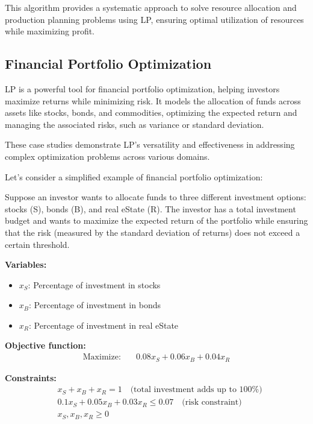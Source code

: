 \documentclass[12pt]{book} %
\begin{document}
This algorithm provides a systematic approach to solve resource allocation and production planning problems using LP, ensuring optimal utilization of resources while maximizing profit.

\subsection{Financial Portfolio Optimization}

LP is a powerful tool for financial portfolio optimization, helping investors maximize returns while minimizing risk. It models the allocation of funds across assets like stocks, bonds, and commodities, optimizing the expected return and managing the associated risks, such as variance or standard deviation.

These case studies demonstrate LP's versatility and effectiveness in addressing complex optimization problems across various domains.

Let's consider a simplified example of financial portfolio optimization:

Suppose an investor wants to allocate funds to three different investment options: stocks (S), bonds (B), and real eState (R). The investor has a total investment budget and wants to maximize the expected return of the portfolio while ensuring that the risk (measured by the standard deviation of returns) does not exceed a certain threshold.

\textbf{Variables:}
\begin{itemize}
    \item \(x_S\): Percentage of investment in stocks
    \item \(x_B\): Percentage of investment in bonds
    \item \(x_R\): Percentage of investment in real eState
\end{itemize}

\textbf{Objective function:}
\begin{align*}
\text{Maximize:} \quad & 0.08x_S + 0.06x_B + 0.04x_R
\end{align*}

\textbf{Constraints:}
\begin{align*}
& x_S + x_B + x_R = 1 \quad \text{(total investment adds up to 100\%)} \\
& 0.1x_S + 0.05x_B + 0.03x_R \leq 0.07 \quad \text{(risk constraint)} \\
& x_S, x_B, x_R \geq 0
\end{align*}
\end{document}
